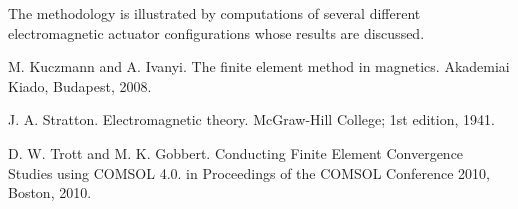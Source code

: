 The methodology is illustrated by computations of several different electromagnetic actuator configurations whose results are discussed.


\begin{thebibliography}{10}

{\sc M. Kuczmann and A. Ivanyi}. {The finite element method in magnetics}. Akademiai Kiado, Budapest, 2008.



{\sc J. A. Stratton}. {Electromagnetic theory}. McGraw-Hill College; 1st edition, 1941.



{\sc D. W. Trott and M. K. Gobbert}. {Conducting Finite Element Convergence Studies using COMSOL 4.0}. in Proceedings of the COMSOL Conference 2010, Boston, 2010.

\end{thebibliography}
